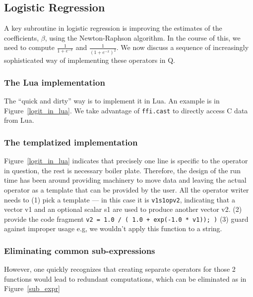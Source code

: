 \subsection{Logistic Regression}

A key subroutine in logistic regression \cite{Hastie2009} is improving the 
estimates of the
coefficients, \(\beta\), using the Newton-Raphson algorithm.
In the course of this, we need to compute
\(\frac{1}{1 + e^{-x}}\) and 
\(\frac{1}{(1 + e^{-x})^2}\).
We now discuss a sequence of increasingly sophisticated way of implementing
these operators in Q.

\subsubsection{The Lua implementation}
\label{Logit_Lua}
The ``quick and dirty'' way is to implement it in Lua. An example is 
in Figure~\ref{logit_in_lua}. We take advantage of {\tt ffi.cast}
to directly access C data from Lua.
\begin{figure}
\centering
{}
\end{figure}

\subsubsection{The templatized implementation}
\label{Logit_template}
Figure~\ref{logit_in_lua} indicates that precisely one line is specific to the
operator in question, the rest is necessary boiler plate. Therefore, the design
of the run time has been around providing machinery to move data and leaving
the actual operator as a template that can be provided by the user. All the operator
writer needs to (1) pick a template --- in this case it is {\tt v1s1opv2}, indicating that a
vector v1 and an optional scalar s1 are used to produce another vector v2.
(2) provide the code fragment {\tt  v2 = 1.0 / ( 1.0 + exp(-1.0 * v1)); )} (3)
guard against improper usage e.g, we wouldn't apply this function to a string.


\subsubsection{Eliminating common sub-expressions}
However, one quickly recognizes that creating separate operators for those 2
functions would lead to 
redundant computations, which can be eliminated as in Figure~\ref{sub_expr}

